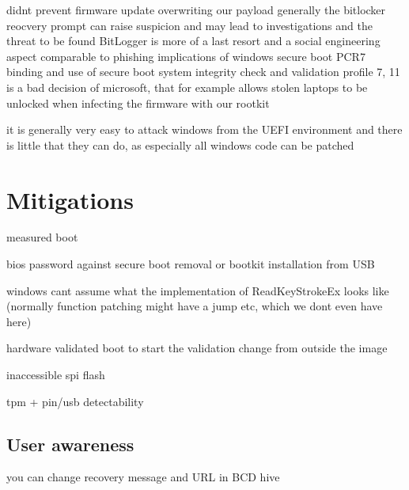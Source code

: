 
didnt prevent firmware update overwriting our payload
generally the bitlocker reocvery prompt can raise suspicion and may lead to investigations and the threat to be found
BitLogger is more of a last resort and a social engineering aspect comparable to phishing
implications of windows secure boot PCR7 binding and use of secure boot system integrity check and validation profile 7, 11 is a bad decision of microsoft, that for example allows
stolen laptops to be unlocked when infecting the firmware with our rootkit


it is generally very easy to attack windows from the \ac{UEFI} environment and there is little that they can do, as especially all windows code can be patched


\section{Mitigations}

measured boot 

bios password against secure boot removal or bootkit installation from USB

windows cant assume what the implementation of ReadKeyStrokeEx looks like (normally function patching might have a jump etc, which we dont even have here)

hardware validated boot to start the validation change from outside the image

inaccessible spi flash

tpm + pin/usb detectability

\subsection{User awareness}

you can change recovery message and URL in BCD hive



